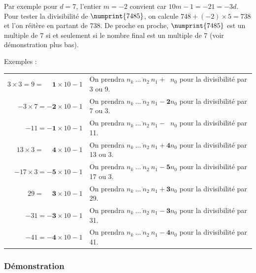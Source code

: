 \documentclass[a4paper]{article}
\begin{document}
	Par exemple pour $d = 7$, l'entier $m = -2$ convient car $10m - 1 = -21 = -3d$. Pour tester la divisibilité de $\numprint{7485}$, on calcule $748 + (-2) × 5 = 738$ et l'on réitère en partant de $738$. De proche en proche, $\numprint{7485}$ est un multiple de $7$ si et seulement si le nombre final est un multiple de $7$ (voir démonstration plus bas).\\

\vfill

{\parindent=0.5cm Exemples :} 

\vspace{-3mm}

\begin{center}
\begin{tabular}{rl}

	$3 × 3 = 9 = \mathbf{\phantom{-}1} × 10 - 1$ & On prendra $\overline{n_{k}~\dots~n_{2}~n_{1}}~\mathbf{+~\phantom{1}}n_{0}$ pour la divisibilité par 3 ou 9.\\
	  $-3 × 7 = \mathbf{-2} × 10 - 1$ & On prendra $\overline{n_{k}~\dots~n_{2}~n_{1}}~\mathbf{-~2}n_{0}$ pour la divisibilité par 7 ou 3.\\
	     $-11 = \mathbf{-1} × 10 - 1$ & On prendra $\overline{n_{{k}}~\dots~n_{2}~n_{1}}~\mathbf{-~\phantom{1}}n_{0}$ pour la divisibilité par 11.\\
	   $13 × 3 = \mathbf{\phantom{-}4} × 10 - 1$ & On prendra $\overline{n_{{k}}~\dots~n_{2}~n_{1}}~\mathbf{+~4}n_{0}$ pour la divisibilité par 13 ou 3.\\
	 $-17 × 3 = \mathbf{-5} × 10 - 1$ & On prendra $\overline{n_{{k}}~\dots~n_{2}~n_{1}}~\mathbf{-~5}n_{0}$ pour la divisibilité par 17 ou 3.\\
	      $29 = \mathbf{\phantom{-}3} × 10 - 1$ & On prendra $\overline{n_{{k}}~\dots~n_{2}~n_{1}}~\mathbf{+~3}n_{0}$ pour la divisibilité par 29.\\
	     $-31 = \mathbf{-3} × 10 - 1$ & On prendra $\overline{n_{{k}}~\dots~n_{2}~n_{1}}~\mathbf{-~3}n_{0}$ pour la divisibilité par 31.\\
	     $-41 = \mathbf{-4} × 10 - 1$ & On prendra $\overline{n_{{k}}~\dots~n_{2}~n_{1}}~\mathbf{-~4}n_{0}$ pour la divisibilité par 41.\\

\end{tabular}
\end{center}

\vfill

\subsubsection*{Démonstration}
\end{document}
